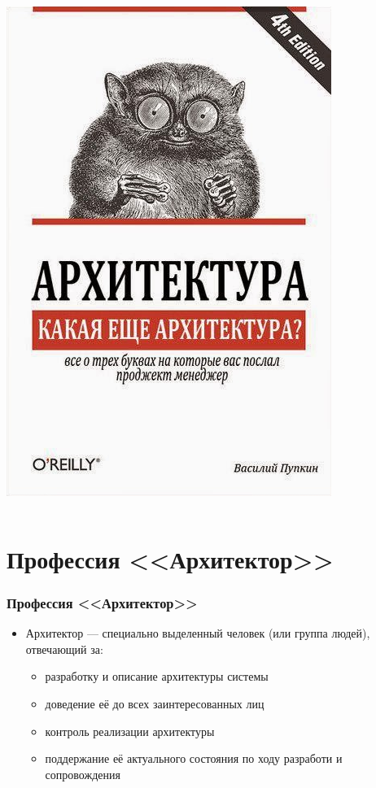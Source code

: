 \documentclass[xetex,mathserif,serif]{beamer}
\begin{document}
\begin{frame}
\begin{columns}
\begin{column}{0.3\textwidth}
				\includegraphics[width=\textwidth]{whatArchitecture.png}
			\end{column}
		\end{columns}
	\end{frame}

	\section{Профессия <<Архитектор>>}

	\begin{frame}
		\frametitle{Профессия <<Архитектор>>}
		\begin{itemize}
			\item Архитектор --- специально выделенный человек (или группа людей), отвечающий за:
			\begin{itemize}
				\item разработку и описание архитектуры системы
				\item доведение её до всех заинтересованных лиц
				\item контроль реализации архитектуры
				\item поддержание её актуального состояния по ходу разработи и сопровождения
			\end{itemize}
		\end{itemize}
	\end{frame}
\end{document}
